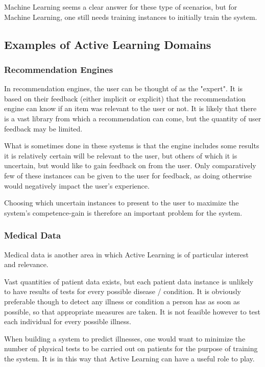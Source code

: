 \documentclass[a4paper,11pt]{report}
\begin{document}
Machine Learning seems a clear answer for these type of scenarios, but for Machine Learning, one still needs training instances to initially train the system.

\subsection{Examples of Active Learning Domains}
\subsubsection{Recommendation Engines}
In recommendation engines, the user can be thought of as the "expert". It is based on their feedback (either implicit or explicit) that the recommendation engine can know if an item was relevant to the user or not. It is likely that there is a vast library from which a recommendation can come, but the quantity of user feedback may be limited.

What is sometimes done in these systems is that the engine includes some results it is relatively certain will be relevant to the user, but others of which it is uncertain, but would like to gain feedback on from the user. Only comparatively few of these instances can be given to the user for feedback, as doing otherwise would negatively impact the user's experience.

Choosing which uncertain instances to present to the user to maximize the system's competence-gain is therefore an important problem for the system.

\subsubsection{Medical Data}
Medical data is another area in which Active Learning is of particular interest and relevance.

Vast quantities of patient data exists, but each patient data instance is unlikely to have results of tests for every possible disease / condition. It is obviously preferable though to detect any illness or condition a person has as soon as possible, so that appropriate measures are taken. It is not feasible however to test each individual for every possible illness.

When building a system to predict illnesses, one would want to minimize the number of physical tests to be carried out on patients for the purpose of training the system. It is in this way that Active Learning can have a useful role to play.
\end{document}
